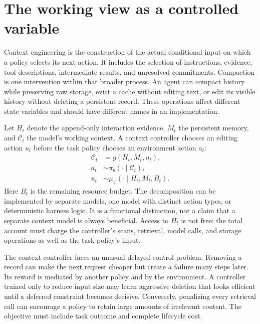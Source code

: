 \section{The working view as a controlled variable}\label{sec:C12:control}
Context engineering is the construction of the actual conditional input on which a policy selects its next action. It includes the selection of instructions, evidence, tool descriptions, intermediate results, and unresolved commitments. Compaction is one intervention within that broader process. An agent can compact history while preserving raw storage, evict a cache without editing text, or edit its visible history without deleting a persistent record. These operations affect different state variables and should have different names in an implementation.

Let $H_t$ denote the append-only interaction evidence, $M_t$ the persistent memory, and $\mathcal C_t$ the model's working context. A context controller chooses an editing action $u_t$ before the task policy chooses an environment action $a_t$:
\begin{align}
 \mathcal C_t&=g(H_t,M_t,u_t),\\
 a_t&\sim\pi_\theta(\cdot\mid\mathcal C_t),\\
 u_t&\sim\mu_\psi(\cdot\mid H_t,M_t,B_t).
\end{align}
Here $B_t$ is the remaining resource budget. The decomposition can be implemented by separate models, one model with distinct action types, or deterministic harness logic. It is a functional distinction, not a claim that a separate context model is always beneficial. Access to $H_t$ is not free: the total account must charge the controller's scans, retrieval, model calls, and storage operations as well as the task policy's input.

The context controller faces an unusual delayed-control problem. Removing a record can make the next request cheaper but create a failure many steps later. Its reward is mediated by another policy and by the environment. A controller trained only to reduce input size may learn aggressive deletion that looks efficient until a deferred constraint becomes decisive. Conversely, penalizing every retrieval call can encourage a policy to retain large amounts of irrelevant content. The objective must include task outcome and complete lifecycle cost.

